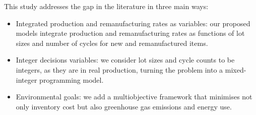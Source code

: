 \documentclass[11pt]{article}
\begin{document}



\color{black}

\noindent This study addresses the gap in the literature in three main ways:
\begin{itemize}
    \item Integrated production and remanufacturing rates as variables: our proposed models integrate production and remanufacturing rates as functions of lot sizes and number of cycles for new and remanufactured items.
    \item Integer decisions variables: we consider lot sizes and cycle counts to be integers, as they are in real production, turning the problem into a mixed-integer programming model.
    \item Environmental goals: we add a multiobjective framework that  minimises not only inventory cost but also greenhouse gas emissions and energy use.
\end{itemize}
\end{document}
